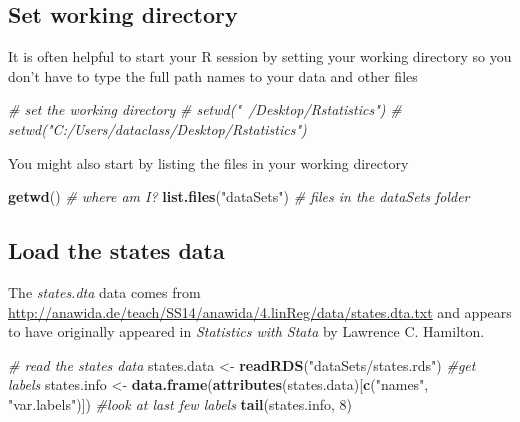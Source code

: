 \documentclass[]{book}
\newenvironment{Shaded}{\begin{snugshade}}{\end{snugshade}}
\newcommand{\KeywordTok}[1]{\textcolor[rgb]{0.13,0.29,0.53}{\textbf{#1}}}
\newcommand{\DecValTok}[1]{\textcolor[rgb]{0.00,0.00,0.81}{#1}}
\newcommand{\StringTok}[1]{\textcolor[rgb]{0.31,0.60,0.02}{#1}}
\newcommand{\CommentTok}[1]{\textcolor[rgb]{0.56,0.35,0.01}{\textit{#1}}}
\newcommand{\NormalTok}[1]{#1}
\begin{document}
\subsection{Set working directory}\label{set-working-directory}

It is often helpful to start your R session by setting your working
directory so you don't have to type the full path names to your data and
other files

\begin{Shaded}
\begin{Highlighting}[]
  \CommentTok{# set the working directory}
  \CommentTok{# setwd("~/Desktop/Rstatistics")}
  \CommentTok{# setwd("C:/Users/dataclass/Desktop/Rstatistics")}
\end{Highlighting}
\end{Shaded}

You might also start by listing the files in your working directory

\begin{Shaded}
\begin{Highlighting}[]
  \KeywordTok{getwd}\NormalTok{() }\CommentTok{# where am I?}
  \KeywordTok{list.files}\NormalTok{(}\StringTok{"dataSets"}\NormalTok{) }\CommentTok{# files in the dataSets folder}
\end{Highlighting}
\end{Shaded}

\subsection{Load the states data}\label{load-the-states-data}

The \emph{states.dta} data comes from
\url{http://anawida.de/teach/SS14/anawida/4.linReg/data/states.dta.txt}
and appears to have originally appeared in \emph{Statistics with Stata}
by Lawrence C. Hamilton.

\begin{Shaded}
\begin{Highlighting}[]
  \CommentTok{# read the states data}
\NormalTok{  states.data <-}\StringTok{ }\KeywordTok{readRDS}\NormalTok{(}\StringTok{"dataSets/states.rds"}\NormalTok{) }
  \CommentTok{#get labels}
\NormalTok{  states.info <-}\StringTok{ }\KeywordTok{data.frame}\NormalTok{(}\KeywordTok{attributes}\NormalTok{(states.data)[}\KeywordTok{c}\NormalTok{(}\StringTok{"names"}\NormalTok{, }\StringTok{"var.labels"}\NormalTok{)])}
  \CommentTok{#look at last few labels}
  \KeywordTok{tail}\NormalTok{(states.info, }\DecValTok{8}\NormalTok{)}
\end{Highlighting}
\end{Shaded}
\end{document}
